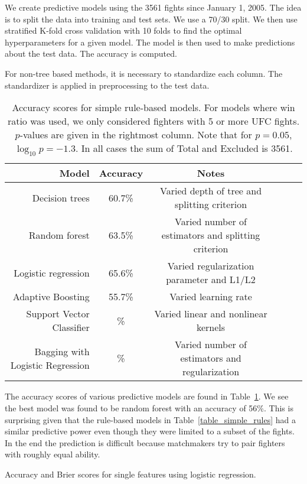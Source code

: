 We create predictive models using the 3561 fights since
January 1, 2005. The idea is to split the data into
training and test sets. We use a 70/30 split. We then
use stratified K-fold cross validation with 10 folds
to find the optimal
hyperparameters for a given model. The model is then
used to make predictions about the test data. The accuracy
is computed.

For non-tree based methods, it is necessary to standardize
each column. The standardizer is applied in preprocessing to
the test data.

\begin{center}
\begin{table}[h]
\begin{tabular}{r|ccccc}
  \toprule
  Model & Accuracy & Notes\\
  \hline
  Decision trees & 60.7\% & Varied depth of tree and splitting criterion\\
  Random forest & 63.5\% & Varied number of estimators and splitting criterion\\
  Logistic regression & 65.6\% & Varied regularization parameter and L1/L2\\
  Adaptive Boosting & 55.7\% & Varied learning rate\\
  Support Vector Classifier & \% & Varied linear and nonlinear kernels\\
  Bagging with Logistic Regression & \% & Varied number of estimators and regularization\\
  \bottomrule
\end{tabular}
\caption{Accuracy scores for simple rule-based models. For models where win ratio was used, we only considered
fighters with 5 or more UFC fights. $p$-values are given in the rightmost column. Note that for $p=0.05$, $\log_{10}p = -1.3$. In all
cases the sum of
Total and Excluded is 3561.}
\label{table_ML_models}
\end{table}
\end{center}

The accuracy scores of various predictive models are found in Table~\ref{table_ML_models}.
We see the best model was found to be random forest with an accuracy of 56\%. This is
surprising given that the rule-based models in Table~\ref{table_simple_rules} had a
similar predictive power even though they were limited to a subset of the fights.
In the end the prediction is difficult because matchmakers try to pair fighters with
roughly equal ability.

\begin{center}
\begin{table}[h]

\caption{Accuracy and Brier scores for single features using logistic regression.}
\end{table}
\end{center}
